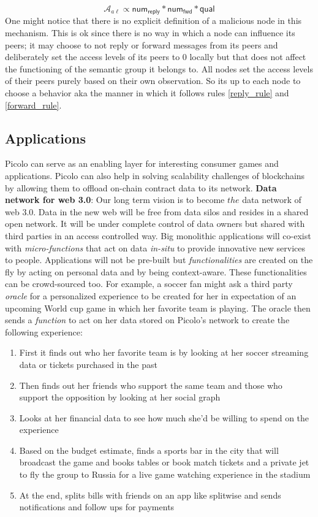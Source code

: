 \newline
$$ \mathcal{A}_{a\ell} \propto \textsf{num}_\textsf{reply} * \textsf{num}_\textsf{fwd} * \textsf{qual}$$
One might notice that there is no explicit definition of a malicious node in this mechanism. This is ok since there is no way in which a node can influence its peers; it may choose to not reply or forward messages from its peers and deliberately set the access levels of its peers to 0 locally but that does not affect the functioning of the semantic group it belongs to. All nodes set the access levels of their peers purely based on their own observation. So its up to each node to choose a behavior aka the manner in which it follows rules \ref{reply_rule} and \ref{forward_rule}.

\subsection{Applications} \label{sect:applications}
\textsf{Picolo} can serve as an enabling layer for interesting consumer games and applications. \textsf{Picolo} can also help in solving scalability challenges of blockchains by allowing them to offload on-chain contract data to its network. 
\newline\newline
\textbf{Data network for web 3.0}: Our long term vision is to become $the$ data network of web 3.0. Data in the new web will be free from data silos and resides in a shared open network. It will be under complete control of data owners but shared with third parties in an access controlled way. Big monolithic applications will co-exist with \textit{micro-functions} that act on data \textit{in-situ} to provide innovative new services to people. Applications will not be pre-built but \textit{functionalities} are created on the fly by acting on personal data and by being context-aware. These functionalities can be crowd-sourced too. For example, a soccer fan might ask a third party \textit{oracle} for a personalized experience to be created for her in expectation of an upcoming World cup game in which her favorite team is playing. The oracle then sends a \textit{function} to act on her data stored on \textsf{Picolo}'s network to create the following experience: 
\begin{enumerate}
	\item First it finds out who her favorite team is by looking at her soccer streaming data or tickets purchased in the past
	\item Then finds out her friends who support the same team and those who support the opposition by looking at her social graph
	\item Looks at her financial data to see how much she'd be willing to spend on the experience
	\item Based on the budget estimate, finds a sports bar in the city that will broadcast the game and books tables or book match tickets and a private jet to fly the group to Russia for a live game watching experience in the stadium
	\item At the end, splits bills with friends on an app like splitwise and sends notifications and follow ups for payments
\end{enumerate}
